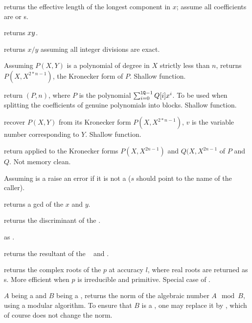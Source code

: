  returns the effective length of the longest
component in $x$; assume all coefficients are  or s.

 returns $x\*y$.

 returns $x/y$ assuming all integer
divisions are exact.

 Assuming $P(X,Y)$ is a polynomial
of degree in $X$ strictly less than $n$, returns $P(X,X^{2*n-1})$, the
Kronecker form of $P$. Shallow function.

 return
$(P, n)$, where $P$ is the polynomial
$\sum_{i = 0}^{{\tt lQ} - 1} Q[i] x^i$. To be used when splitting
the coefficients of genuine polynomials into blocks. Shallow function.

 recover $P(X,Y)$
from its Kronecker form $P(X,X^{2*n-1})$, $v$ is the variable number
corresponding to $Y$. Shallow function.

 return 
applied to the Kronecker forms $P(X,X^{2n-1})$ and $Q(X,X^{2n-1}$
of $P$ and $Q$. Not memory clean.


 Assuming  is a 
raise an error if it is not a  ($s$ should point to the name of the
caller).

 returns a gcd of the  $x$ and $y$.

 returns the discriminant of the 
.

 as .

 returns the resultant of the
~ and .

 returns the complex roots of the
 $p$ at accuracy $l$, where real roots are returned as s.
More efficient when $p$ is irreducible and primitive. Special case
of .


 $A$ being a  and $B$ being a
, returns the norm of the algebraic number $A \mod B$, using a
modular algorithm. To ensure that $B$ is a , one may replace it by
, which of course does not change the norm.

